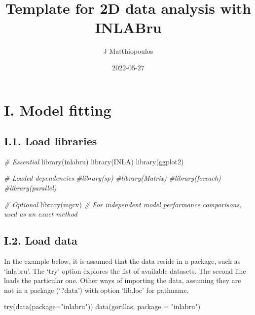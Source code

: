 \documentclass[
]{article}
\title{Template for 2D data analysis with INLABru}
\author{J Matthiopoulos}
\date{2022-05-27}
\newenvironment{Shaded}{\begin{snugshade}}{\end{snugshade}}
\newcommand{\AttributeTok}[1]{\textcolor[rgb]{0.77,0.63,0.00}{#1}}
\newcommand{\CommentTok}[1]{\textcolor[rgb]{0.56,0.35,0.01}{\textit{#1}}}
\newcommand{\FunctionTok}[1]{\textcolor[rgb]{0.00,0.00,0.00}{#1}}
\newcommand{\NormalTok}[1]{#1}
\newcommand{\StringTok}[1]{\textcolor[rgb]{0.31,0.60,0.02}{#1}}
\begin{document}
\maketitle

\hypertarget{i.-model-fitting}{%
\section{I. Model fitting}\label{i.-model-fitting}}

\hypertarget{i.1.-load-libraries}{%
\subsection{I.1. Load libraries}\label{i.1.-load-libraries}}

\begin{Shaded}
\begin{Highlighting}[]
\CommentTok{\# Essential}
\FunctionTok{library}\NormalTok{(inlabru)}
\FunctionTok{library}\NormalTok{(INLA)}
\FunctionTok{library}\NormalTok{(ggplot2)}

\CommentTok{\# Loaded dependencies}
\CommentTok{\#library(sp)}
\CommentTok{\#library(Matrix)}
\CommentTok{\#library(foreach)}
\CommentTok{\#library(parallel)}

\CommentTok{\# Optional}
\FunctionTok{library}\NormalTok{(mgcv) }\CommentTok{\# For independent model performance comparisons, used as an exact method}
\end{Highlighting}
\end{Shaded}

\hypertarget{i.2.-load-data}{%
\subsection{I.2. Load data}\label{i.2.-load-data}}

In the example below, it is assumed that the data reside in a package,
such as `inlabru'. The `try' option explores the list of available
datasets. The second line loads the particular one. Other ways of
importing the data, assuming they are not in a package (`?data') with
option `lib.loc' for pathname.

\begin{Shaded}
\begin{Highlighting}[]
\FunctionTok{try}\NormalTok{(}\FunctionTok{data}\NormalTok{(}\AttributeTok{package=}\StringTok{"inlabru"}\NormalTok{))}
\FunctionTok{data}\NormalTok{(gorillas, }\AttributeTok{package =} \StringTok{"inlabru"}\NormalTok{)}
\end{Highlighting}
\end{Shaded}
\end{document}
